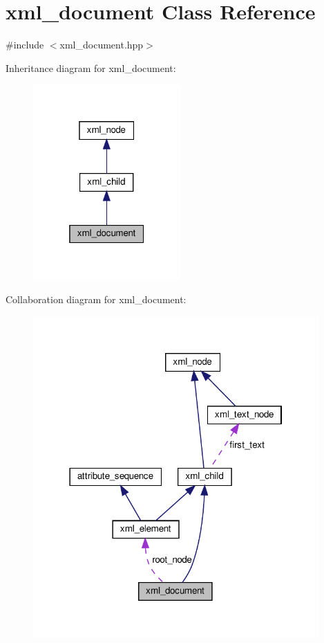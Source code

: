 \hypertarget{classxml__document}{}\section{xml\+\_\+document Class Reference}
\label{classxml__document}


{\ttfamily \#include $<$xml\+\_\+document.\+hpp$>$}



Inheritance diagram for xml\+\_\+document\+:
\nopagebreak
\begin{figure}[H]
\begin{center}
\leavevmode
\includegraphics[width=160pt]{d4/d5a/classxml__document__inherit__graph}
\end{center}
\end{figure}


Collaboration diagram for xml\+\_\+document\+:
\nopagebreak
\begin{figure}[H]
\begin{center}
\leavevmode
\includegraphics[width=310pt]{d5/dae/classxml__document__coll__graph}
\end{center}
\end{figure}
